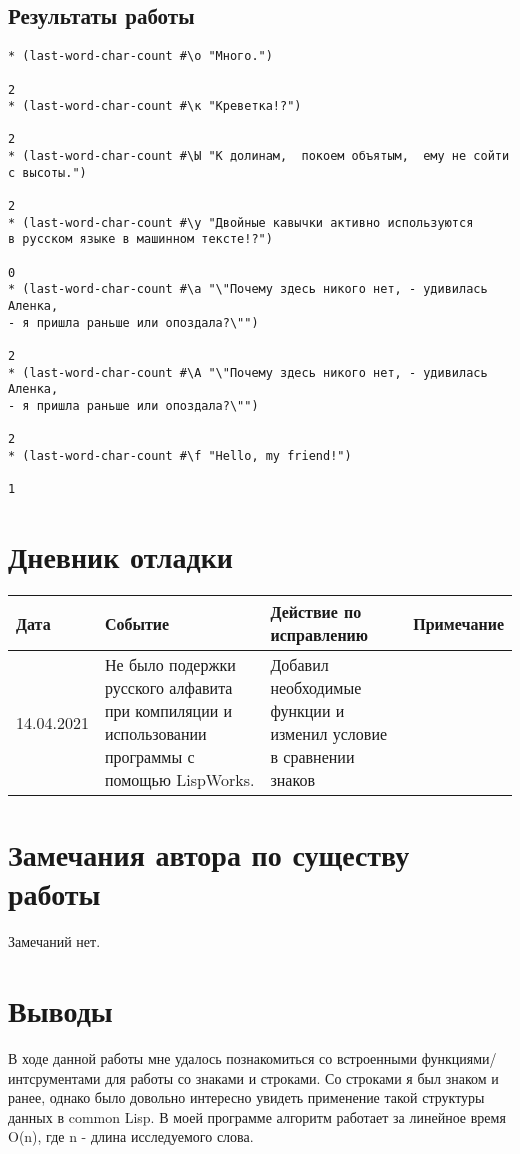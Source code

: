 \documentclass[12pt]{article}
\begin{document}
\subsection{Результаты работы}
\begin{verbatim}
* (last-word-char-count #\о "Много.")

2
* (last-word-char-count #\к "Креветка!?")

2
* (last-word-char-count #\Ы "К долинам,  покоем объятым,  ему не сойти с высоты.")

2
* (last-word-char-count #\у "Двойные кавычки активно используются
в русском языке в машинном тексте!?")

0
* (last-word-char-count #\а "\"Почему здесь никого нет, - удивилась Аленка,
- я пришла раньше или опоздала?\"")

2
* (last-word-char-count #\А "\"Почему здесь никого нет, - удивилась Аленка,
- я пришла раньше или опоздала?\"")

2
* (last-word-char-count #\f "Hello, my friend!")

1
\end{verbatim}
%

\section{Дневник отладки}
\begin{tabular}{|p{50pt}|p{130pt}|p{130pt}|p{70pt}|}
\hline
Дата & Событие & Действие по исправлению & Примечание \\ \hline
14.04.2021 & Не было подержки русского алфавита при компиляции и использовании программы с помощью  LispWorks. & Добавил необходимые функции и изменил условие в сравнении знаков &\\
\hline
\end{tabular}

\section{Замечания автора по существу работы}
Замечаний нет.

\section{Выводы}
В ходе данной работы мне удалось познакомиться со встроенными функциями/интсрументами для работы со знаками и строками. Со строками я был знаком и ранее, однако было довольно интересно увидеть применение такой структуры данных в common Lisp. В моей программе алгоритм работает за линейное время O(n), где n - длина исследуемого слова.
\end{document}
